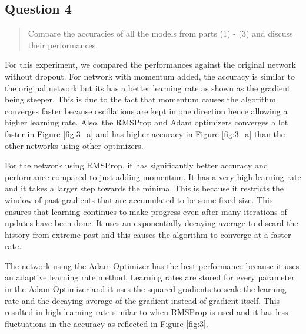 \subsection{Question 4}
\label{1q4}
\begin{quote}
Compare the accuracies of all the models from parts (1) - (3) and discuss their performances.
\end{quote}

For this experiment, we compared the performances against the original network without dropout. For network with momentum added, the accuracy is similar to the original network but its has a better learning rate as shown as the gradient being steeper. This is due to the fact that momentum causes the algorithm converges faster because oscillations are kept in one direction hence allowing a higher learning rate. Also, the RMSProp and Adam optimizers converges a lot faster in Figure \ref{fig:3_a} and has higher accuracy in Figure \ref{fig:3_a} than the other networks using other optimizers.

For the network using RMSProp, it has significantly better accuracy and performance compared to just adding momentum. It has a very high learning rate and it takes a larger step towards the minima. This is because it restricts the window of past gradients that are accumulated to be some fixed size. This ensures that learning continues to make progress even after many iterations of updates have been done. It uses an exponentially decaying average to discard the history from extreme past and this causes the algorithm to converge at a faster rate. 

The network using the Adam Optimizer has the best performance because it uses an adaptive learning rate method. Learning rates are stored for every parameter in the Adam Optimizer and it uses the squared gradients to scale the learning rate and the decaying average of the gradient instead of gradient itself. This resulted in high learning rate similar to when RMSProp is used and it has less fluctuations in the accuracy as reflected in Figure \ref{fig:3}. 